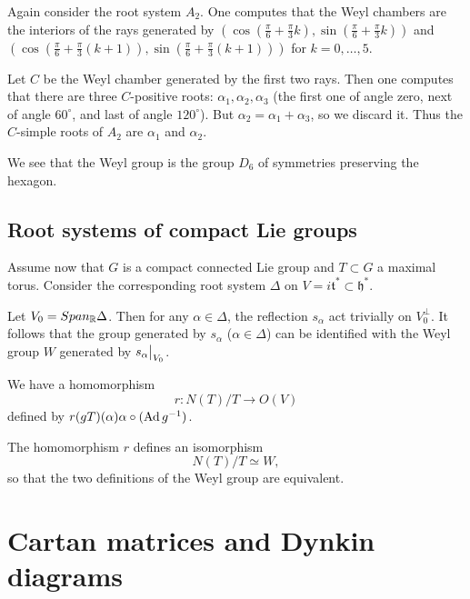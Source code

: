 \documentclass[11pt, english]{article}
\begin{document}
\begin{example}
 Again consider the root system $A_2$. One computes that the Weyl chambers are the interiors of the rays generated by $\left(\cos( \frac{\pi}{6}+\frac{\pi}{3}k), \sin( \frac{\pi}{6} + \frac{\pi}3 k)\right)$ and $\left(\cos( \frac{\pi}{6}+\frac{\pi}{3}(k+1)), \sin( \frac{\pi}{6} + \frac{\pi}3 (k+1))\right)$ for $k=0,\ldots,5$.

Let $C$ be the Weyl chamber generated by the first two rays. Then one computes that there are three $C$-positive roots: $\alpha_1,\alpha_2,\alpha_3$ (the first one of angle zero, next of angle $60^\circ$, and last of angle $120^\circ$). But $\alpha_2=\alpha_1+\alpha_3$, so we discard it. Thus the $C$-simple roots of $A_2$ are $\alpha_1$ and $\alpha_2$.

We see that the Weyl group is the group $D_6$ of symmetries preserving the hexagon.
\end{example}

\subsection{Root systems of compact Lie groups}

Assume now that $G$ is a compact connected Lie group and $T \subset G$ a maximal torus. Consider the corresponding root system $\Delta$ on $V=i \mathfrak t ^\ast \subset \mathfrak h^\ast$. 

Let $V_0 = Span_{\mathbb{R}} \Delta$. Then for any $\alpha \in \Delta$, the reflection $s_\alpha$ act trivially on $V_0^\perp$. It follows that the group generated by $s_\alpha$ ($\alpha \in \Delta$) can be identified with the Weyl group $W$ generated by $\restr{s_\alpha}{V_0}$.

We have a homomorphism
$$
r \colon N(T) / T \to O(V)
$$
defined by $r(gT)(\alpha) \alpha \circ (\operatorname{Ad} g^{-1})$.

\begin{thm}
 The homomorphism $r$ defines an isomorphism 
$$
N(T) / T \simeq W,
$$
so that the two definitions of the Weyl group are equivalent.
\end{thm}


\newpage
\section{Cartan matrices and Dynkin diagrams}





\newpage
\appendix
\end{document}
